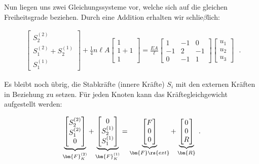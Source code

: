 Nun liegen uns zwei Gleichungssysteme vor, welche sich auf die gleichen Freiheitsgrade beziehen. Durch eine Addition erhalten wir schlie$\beta$lich:

\begin{equation}
\label{stabFEM7}
\begin{align}
\begin{bmatrix}
S_2^{(2)} \\
S_1^{(2)} + S_2^{(1)} \\
S_1^{(1)}
\end{bmatrix} + \frac{1}{4}n\ell A \begin{bmatrix}
1 \\
1+1\\
1
\end{bmatrix} = \frac{EA}{\ell}\begin{bmatrix}
1 & -1 & 0\\
-1 & 2 & -1\\
0 & -1 & 1
\end{bmatrix} \begin{bmatrix}
u_1 \\
u_2\\
u_3
\end{bmatrix}
\end{align} \; .
\end{equation}

Es bleibt noch übrig, die Stabkräfte (innere Kräfte) $S_i$ mit den externen Kräften in Beziehung zu setzen. Für jeden Knoten kann das Kräftegleichgewicht aufgestellt werden:

\begin{equation}
\label{stabFEM8}
\underbrace{\begin{bmatrix}
S_2^{(2)} \\
S_1^{(2)} \\
0
\end{bmatrix}}_{\bm{F}_K^{(2)}} + \underbrace{\begin{bmatrix}
0 \\
S_2^{(1)} \\
S_1^{(1)}
\end{bmatrix}}_{\bm{F}_K^{(1)}} = \underbrace{\begin{bmatrix}
F \\
0 \\
0
\end{bmatrix}}_{\bm{F}\rs{ext}} + \underbrace{\begin{bmatrix}
0 \\
0 \\
R
\end{bmatrix}}_{\bm{R}} \;.
\end{equation}

